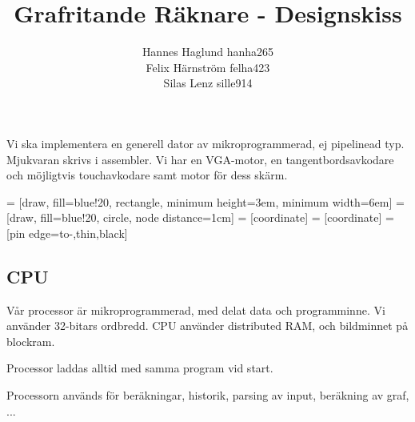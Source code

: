 \documentclass[]{article}
\title{Grafritande Räknare - Designskiss}
\author{Hannes Haglund hanha265\\Felix Härnström felha423\\Silas Lenz sille914}
\begin{document}
\maketitle
\newpage

\section{}
Vi ska implementera en generell dator av mikroprogrammerad, ej pipelinead typ. Mjukvaran skrivs i assembler. Vi har en VGA-motor, en tangentbordsavkodare och möjligtvis touchavkodare samt motor för dess skärm. 

 = [draw, fill=blue!20, rectangle, 
minimum height=3em, minimum width=6em]
 = [draw, fill=blue!20, circle, node distance=1cm]
 = [coordinate]
 = [coordinate]
 = [pin edge={to-,thin,black}]
\begin{center}

\end{center}
\subsection{CPU}
Vår processor är mikroprogrammerad, med delat data och programminne. Vi använder 32-bitars ordbredd. CPU använder distributed RAM, och bildminnet på blockram. 

Processor laddas alltid med samma program vid start. 

Processorn används för beräkningar, historik, parsing av input, beräkning av graf, ...
\end{document}
